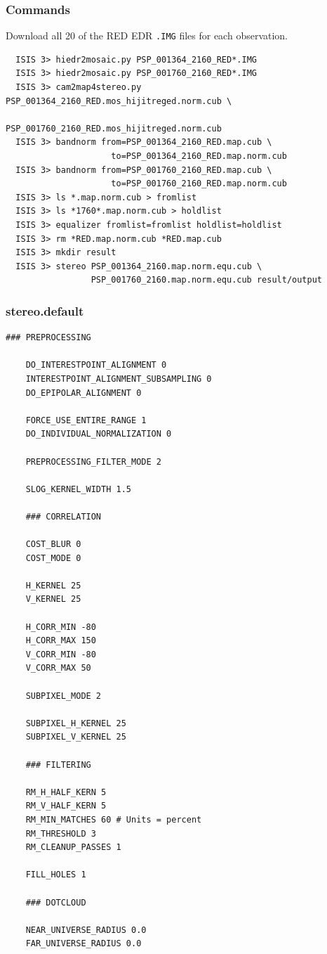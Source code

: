 \subsubsection*{Commands}

Download all 20 of the RED EDR \texttt{.IMG} files for each observation.
\begin{verbatim}
  ISIS 3> hiedr2mosaic.py PSP_001364_2160_RED*.IMG
  ISIS 3> hiedr2mosaic.py PSP_001760_2160_RED*.IMG
  ISIS 3> cam2map4stereo.py PSP_001364_2160_RED.mos_hijitreged.norm.cub \
                            PSP_001760_2160_RED.mos_hijitreged.norm.cub
  ISIS 3> bandnorm from=PSP_001364_2160_RED.map.cub \
                     to=PSP_001364_2160_RED.map.norm.cub
  ISIS 3> bandnorm from=PSP_001760_2160_RED.map.cub \
                     to=PSP_001760_2160_RED.map.norm.cub
  ISIS 3> ls *.map.norm.cub > fromlist
  ISIS 3> ls *1760*.map.norm.cub > holdlist
  ISIS 3> equalizer fromlist=fromlist holdlist=holdlist
  ISIS 3> rm *RED.map.norm.cub *RED.map.cub
  ISIS 3> mkdir result
  ISIS 3> stereo PSP_001364_2160.map.norm.equ.cub \
                 PSP_001760_2160.map.norm.equ.cub result/output
\end{verbatim}

\subsubsection*{stereo.default}

\begin{center}\begin{minipage}{5.5in}
\begin{Verbatim}[frame=single,fontsize=\small,label=stereo.default for HiRISE East Mareotis Tholus]
    ### PREPROCESSING

    DO_INTERESTPOINT_ALIGNMENT 0
    INTERESTPOINT_ALIGNMENT_SUBSAMPLING 0
    DO_EPIPOLAR_ALIGNMENT 0

    FORCE_USE_ENTIRE_RANGE 1
    DO_INDIVIDUAL_NORMALIZATION 0

    PREPROCESSING_FILTER_MODE 2

    SLOG_KERNEL_WIDTH 1.5

    ### CORRELATION

    COST_BLUR 0
    COST_MODE 0

    H_KERNEL 25
    V_KERNEL 25

    H_CORR_MIN -80
    H_CORR_MAX 150
    V_CORR_MIN -80
    V_CORR_MAX 50

    SUBPIXEL_MODE 2

    SUBPIXEL_H_KERNEL 25
    SUBPIXEL_V_KERNEL 25

    ### FILTERING

    RM_H_HALF_KERN 5
    RM_V_HALF_KERN 5
    RM_MIN_MATCHES 60 # Units = percent
    RM_THRESHOLD 3
    RM_CLEANUP_PASSES 1

    FILL_HOLES 1

    ### DOTCLOUD

    NEAR_UNIVERSE_RADIUS 0.0
    FAR_UNIVERSE_RADIUS 0.0
\end{Verbatim}
\end{minipage}\end{center}

